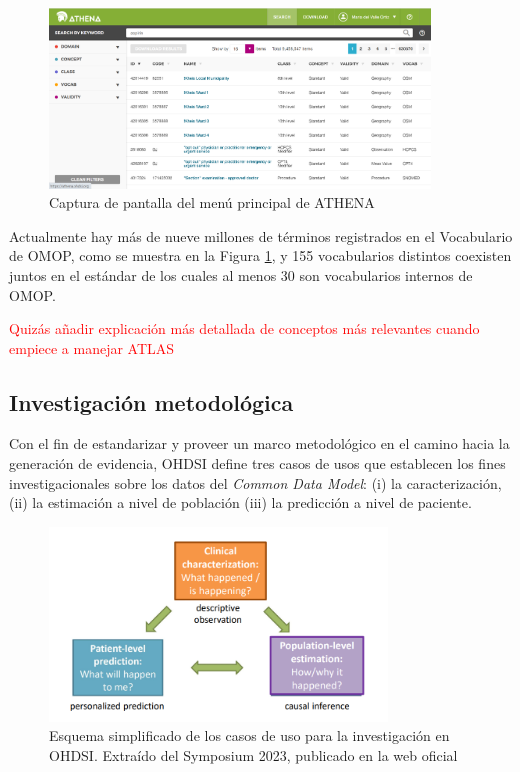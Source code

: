\begin{figure}[H]
\centering
\includegraphics[width=0.90\textwidth]{figures/ATHENAcap.png}
     \caption{Captura de pantalla del menú principal de ATHENA}
    \label{fig:ATHENAcap}
\end{figure}

Actualmente hay más de nueve millones de términos registrados en el Vocabulario de OMOP, como se muestra en la Figura \ref{fig:ATHENAcap}, y 155 vocabularios distintos coexisten juntos en el estándar de los cuales al menos 30 son vocabularios internos de OMOP.

\textcolor{red}{Quizás añadir explicación más detallada de conceptos más relevantes cuando empiece a manejar ATLAS}


\subsection{Investigación metodológica} \label{subsec:05investMetodolog}

Con el fin de estandarizar y proveer un marco metodológico en el camino hacia la generación de evidencia, OHDSI define tres casos de usos que establecen los fines investigacionales sobre los datos del \textit{Common Data Model}: (i) la caracterización, (ii) la estimación a nivel de población (iii) la predicción a nivel de paciente. 

\begin{figure}[H]
\centering
\includegraphics[width=0.80\textwidth]{figures/useCases.png}
     \caption{Esquema simplificado de los casos de uso para la investigación en OHDSI. Extraído del Symposium 2023, publicado en la web oficial \cite{OHDSIwebsite}}
    \label{fig:useCases}
\end{figure}

